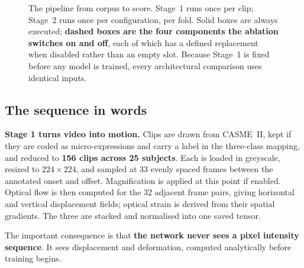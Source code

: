 \begin{figure}[htbp]
	\caption[The data pipeline, end to end]{The pipeline from corpus to score.
	Stage~1 runs once per clip; Stage~2 runs once per configuration, per fold.
	Solid boxes are always executed; \textbf{dashed boxes are the four
	components the ablation switches on and off}, each of which has a defined
	replacement when disabled rather than an empty slot. Because Stage~1 is
	fixed before any model is trained, every architectural comparison uses
	identical inputs.}
	\label{fig:pipeline-overview}
\end{figure}

\subsection{The sequence in words}
\label{sec:pipeline-in-words}

\textbf{Stage 1 turns video into motion.} Clips are drawn from CASME~II, kept
if they are coded as micro-expressions and carry a label in the three-class
mapping, and reduced to \textbf{156 clips across 25 subjects}. Each is loaded
in greyscale, resized to $224\times224$, and sampled at 33 evenly spaced
frames between the annotated onset and offset. Magnification is applied at
this point if enabled. Optical flow is then computed for the 32 adjacent frame
pairs, giving horizontal and vertical displacement fields; optical strain is
derived from their spatial gradients. The three are stacked and normalised
into one saved tensor.

The important consequence is that \textbf{the network never sees a pixel
intensity sequence}. It sees displacement and deformation, computed
analytically before training begins.

